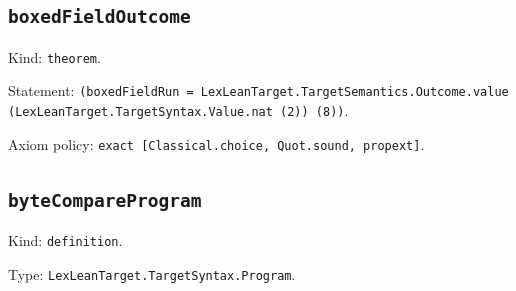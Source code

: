 \documentclass[11pt]{article}
\begin{document}
\subsection*{\texttt{boxedFieldOutcome}}
\noindent Kind: \texttt{theorem}.\par
\noindent Statement: \texttt{(boxedFieldRun = LexLeanTarget.TargetSemantics.Outcome.value (LexLeanTarget.TargetSyntax.Value.nat (2)) (8))}.\par
\noindent Axiom policy: \texttt{exact [Classical.choice, Quot.sound, propext]}.\par
\subsection*{\texttt{byteCompareProgram}}
\noindent Kind: \texttt{definition}.\par
\noindent Type: \texttt{LexLeanTarget.TargetSyntax.Program}.\par
\end{document}
